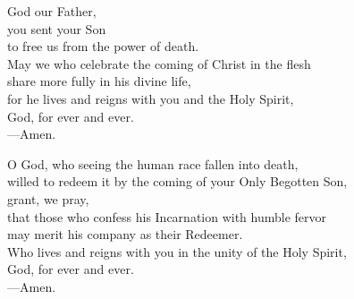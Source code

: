 \prayer


\begin{prayerverse}
God our Father,\\
you sent your Son\\
to free us from the power of death.\\
May we who celebrate the coming of Christ in the flesh\\
share more fully in his divine life,\\
for he lives and reigns with you and the Holy Spirit,\\
God, for ever and ever.\\
{\color{red}---\thinspace}Amen.
\end{prayerverse}


\begin{prayerverse}
O God, who seeing the human race fallen into death,\\
willed to redeem it by the coming of your Only Begotten Son,\\
grant, we pray,\\
that those who confess his Incarnation with humble fervor\\
may merit his company as their Redeemer.\\
Who lives and reigns with you in the unity of the Holy Spirit,\\
God, for ever and ever.\\
{\color{red}---\thinspace}Amen.

\end{prayerverse}


